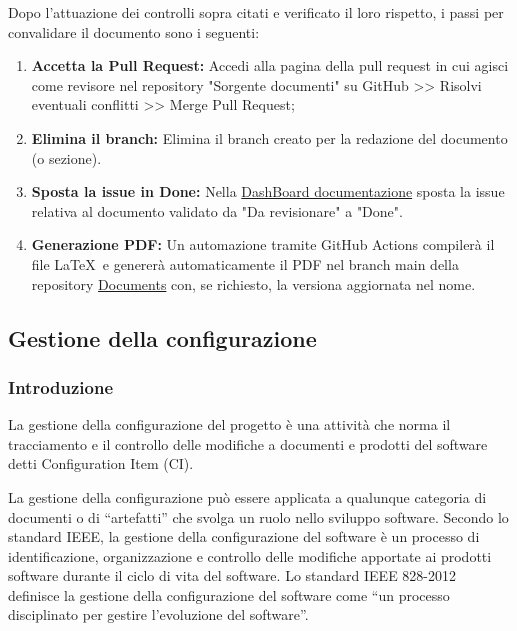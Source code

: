 \documentclass{article}
\begin{document}
Dopo l'attuazione dei controlli sopra citati e verificato il loro rispetto, i passi per convalidare il documento sono i seguenti:
\begin{enumerate}
    \item \textbf{Accetta la Pull Request:} Accedi alla pagina della pull request in cui agisci come revisore nel repository "Sorgente documenti" su GitHub >> Risolvi eventuali conflitti >> Merge Pull Request;
    \item \textbf{Elimina il branch: } Elimina il branch creato per la redazione del documento (o sezione).
    \item \textbf{Sposta la issue in Done:} Nella \href{https://github.com/orgs/ByteOps-swe/projects/1/views/1}{DashBoard documentazione} sposta la issue relativa al documento validato da "Da revisionare" a "Done".
    \item \textbf{Generazione PDF:} Un automazione tramite GitHub Actions compilerà il file   \LaTeX\ e genererà automaticamente il PDF nel branch main della repository \href{https://github.com/ByteOps-swe/Documents}{Documents} con, se richiesto, la versiona aggiornata nel nome.
\end{enumerate}
\subsection{Gestione della configurazione}
\subsubsection{Introduzione}
La gestione della configurazione del progetto è una attività che norma il tracciamento e il controllo delle modifiche a documenti e prodotti del software detti Configuration Item (CI).

La gestione della configurazione può essere applicata a qualunque categoria di documenti o di “artefatti” che svolga un ruolo nello sviluppo software.
Secondo lo standard IEEE, la gestione della configurazione del software è un processo di identificazione, organizzazione e controllo delle modifiche apportate ai prodotti software durante il ciclo di vita del software.
Lo standard IEEE 828-2012 definisce la gestione della configurazione del software come “un processo disciplinato per gestire l’evoluzione del software”.
\end{document}
